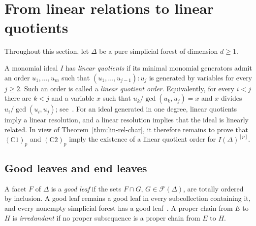 \documentclass{amsart}
\theoremstyle{definition}
\theoremstyle{remark}
\begin{document}

\section{From linear relations to linear quotients}\label{sec:LQ}


Throughout this section, let $\Delta$ be a pure simplicial forest of dimension $d\geq1$. %

A monomial ideal $I$ has {\em linear quotients} if its minimal monomial
generators admit an order $u_1,\ldots,u_m$ such that
$(u_1,\ldots,u_{j-1}):u_j$ is generated by variables for every $j\geq2$.
Such an order is called a {\em linear quotient order}.
Equivalently, for every $i<j$ there are $k<j$ and a variable $x$ such that $u_k/\gcd(u_k,u_j)=x$ and $x$ divides $u_i/\gcd(u_i,u_j)$; see~\cite[Lemma~8.2.3]{HHmonomialideals}.
For an ideal generated in one degree, linear quotients imply a linear
resolution, and a linear resolution implies that the ideal is linearly
related. %
In view of Theorem~\ref{thm:lin-rel-char}, it therefore remains
to prove that $(\mathrm C1)_p$ and $(\mathrm C2)_p$ imply the existence
of a linear quotient order for $I(\Delta)^{[p]}$.


\subsection{Good leaves and end leaves}\label{subsec:good-leaves}

A facet $F$ of $\Delta$ is a {\em good leaf} if the sets
$F\cap G$, $G\in\mathcal F(\Delta)$, are totally ordered by inclusion.
A good leaf remains a good leaf in every subcollection containing it,
and every nonempty simplicial forest has a good
leaf~\cite[Corollary~3.4]{HHTZ}. A proper chain from $E$ to $H$ is {\em irredundant} if no proper
subsequence is a proper chain from $E$ to $H$.


\end{document}
